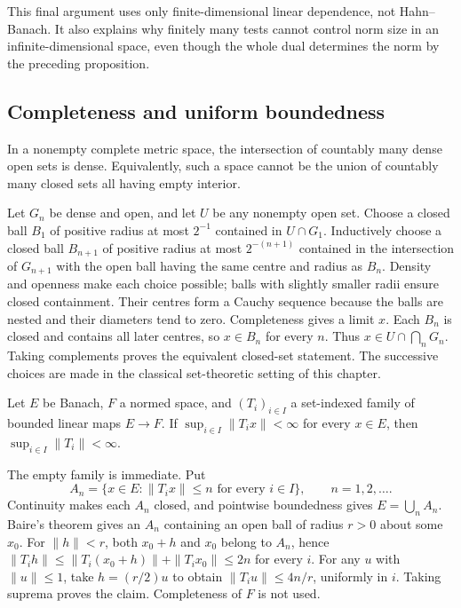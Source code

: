 This final argument uses only finite-dimensional linear dependence,
not Hahn--Banach. It also explains why finitely many tests cannot
control norm size in an infinite-dimensional space, even though the
whole dual determines the norm by the preceding proposition.

\subsection{Completeness and uniform boundedness}
\begin{lemma}
In a nonempty complete metric space, the intersection of countably many
dense open sets is dense. Equivalently, such a space cannot be the union
of countably many closed sets all having empty interior.
\end{lemma}
\Proof
Let $G_n$ be dense and open, and let $U$ be any nonempty open set.
Choose a closed ball $B_1$ of positive radius at most $2^{-1}$ contained
in $U\cap G_1$. Inductively choose a closed ball $B_{n+1}$ of positive
radius at most $2^{-(n+1)}$ contained in the intersection of $G_{n+1}$
with the open ball having the same centre and radius as $B_n$.
Density and openness make each choice possible; balls with slightly
smaller radii ensure closed containment. Their centres form a Cauchy
sequence because the balls are nested and their diameters tend to zero.
Completeness gives a limit $x$. Each $B_n$ is closed and contains all
later centres, so $x\in B_n$ for every $n$. Thus
$x\in U\cap\bigcap_nG_n$. Taking complements proves the equivalent
closed-set statement. The successive choices are made in the classical
set-theoretic setting of this chapter.
\Done

\begin{theorem}
Let $E$ be Banach, $F$ a normed space, and $(T_i)_{i\in I}$ a set-indexed
family of bounded linear maps $E\to F$. If
$\sup_{i\in I}\|T_i x\|<\infty$ for every $x\in E$, then
$\sup_{i\in I}\|T_i\|<\infty$.
\end{theorem}
\Proof
The empty family is immediate. Put
\[
A_n=\{x\in E:\|T_i x\|\leq n\text{ for every }i\in I\},
\qquad n=1,2,\ldots.
\]
Continuity makes each $A_n$ closed, and pointwise boundedness gives
$E=\bigcup_nA_n$. Baire's theorem gives an $A_n$ containing an open
ball of radius $r>0$ about some $x_0$. For $\|h\|<r$, both $x_0+h$
and $x_0$ belong to $A_n$, hence
$\|T_i h\|\leq\|T_i(x_0+h)\|+\|T_i x_0\|\leq2n$ for every $i$.
For any $u$ with $\|u\|\leq1$, take $h=(r/2)u$ to obtain
$\|T_i u\|\leq4n/r$, uniformly in $i$. Taking suprema proves the claim.
Completeness of $F$ is not used.
\Done

